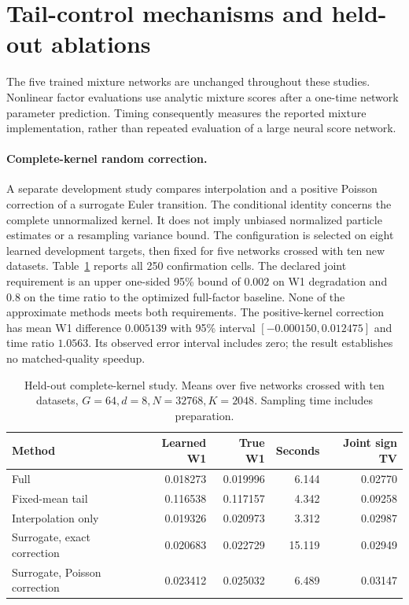 \section{Tail-control mechanisms and held-out ablations}\label{app:dual-results}
The five trained mixture networks are unchanged throughout these studies. Nonlinear factor evaluations use analytic mixture scores after a one-time network parameter prediction. Timing consequently measures the reported mixture implementation, rather than repeated evaluation of a large neural score network.

\paragraph{Complete-kernel random correction.}
A separate development study compares interpolation and a positive Poisson correction of a surrogate Euler transition. The conditional identity concerns the complete unnormalized kernel. It does not imply unbiased normalized particle estimates or a resampling variance bound. The configuration is selected on eight learned development targets, then fixed for five networks crossed with ten new datasets. Table~\ref{tab:dual-kernel} reports all 250 confirmation cells. The declared joint requirement is an upper one-sided 95\% bound of $0.002$ on W1 degradation and $0.8$ on the time ratio to the optimized full-factor baseline. None of the approximate methods meets both requirements. The positive-kernel correction has mean W1 difference $0.005139$ with 95\% interval $[-0.000150,0.012475]$ and time ratio $1.0563$. Its observed error interval includes zero; the result establishes no matched-quality speedup.

\begin{table}[ht]
\centering
\caption{Held-out complete-kernel study. Means over five networks crossed with ten datasets, $G=64,d=8,N=32768,K=2048$. Sampling time includes preparation.}
\label{tab:dual-kernel}
\begin{tabular}{lrrrr}
\toprule
Method & Learned W1 & True W1 & Seconds & Joint sign TV\\
\midrule
Full & 0.018273 & 0.019996 & 6.144 & 0.02770\\
Fixed-mean tail & 0.116538 & 0.117157 & 4.342 & 0.09258\\
Interpolation only & 0.019326 & 0.020973 & 3.312 & 0.02987\\
Surrogate, exact correction & 0.020683 & 0.022729 & 15.119 & 0.02949\\
Surrogate, Poisson correction & 0.023412 & 0.025032 & 6.489 & 0.03147\\
\bottomrule
\end{tabular}
\end{table}

